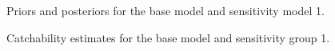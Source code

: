 \documentclass[11pt]{book}
\begin{document}
\begin{figure}[H]

{\centering {} 

}

\caption{Priors and posteriors for the base model and sensitivity model 1.}\label{fig:sens-steepness-prior}
\end{figure}



\begin{figure}[H]

{\centering {} 

}

\caption{Catchability estimates for the base model and sensitivity group 1.}\label{fig:fig-sens-q-q}
\end{figure}
\end{document}
